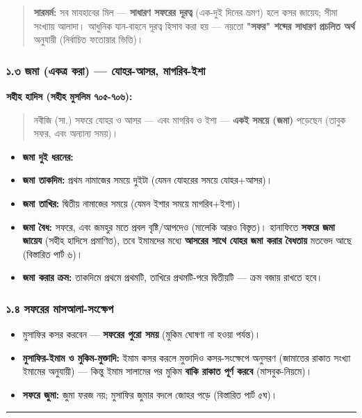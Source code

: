 \begin{quote}
\textbf{সারমর্ম:} সব মাযহাবের মিল — \textbf{সাধারণ সফরের দূরত্ব} (এক-দুই দিনের ভ্রমণ) হলে কসর জায়েয; সীমা সংখ্যায় আলাদা। আধুনিক যান-বাহনে দূরত্ব হিসাব করা হয় — নয়তো \textbf{"সফর" শব্দের সাধারণ প্রচলিত অর্থ} অনুযায়ী (নির্বাচিত ফতোয়ার ভিত্তি)।
\end{quote}

\subsubsection*{১.৩ জমা (একত্র করা) — যোহর-আসর, মাগরিব-ইশা}

\textbf{সহীহ হাদিস (সহীহ মুসলিম ৭০৫-৭০৬):}

\begin{quote}
নবীজি (সা.) সফরে যোহর ও আসর — এবং মাগরিব ও ইশা — \textbf{একই সময়ে (জমা)} পড়েছেন (তাবুক সফর, এবং অন্যান্য সময়)।
\end{quote}

\begin{itemize}
\item \textbf{জমা দুই ধরনের:}
\item \textbf{জমা তাকদিম:} প্রথম নামাজের সময়ে দুইটা (যেমন যোহরের সময়ে যোহর+আসর)।
\item \textbf{জমা তাখির:} দ্বিতীয় নামাজের সময়ে (যেমন ইশার সময়ে মাগরিব+ইশা)।
\item \textbf{জমা বৈধ:} সফরে, এবং জমহুর মতে প্রবল বৃষ্টি/আপদেও (মালেকি আরও বিস্তৃত)। হানাফিতে \textbf{সফরে জমা জায়েয} (সহীহ হাদিসে প্রমাণিত), তবে ইমামদের মধ্যে \textbf{আসরের সাথে যোহর জমা করার বৈধতায়} মতভেদ আছে (বিস্তারিত পার্ট ৬)।
\item \textbf{জমা করার ক্রম:} তাকদিমে প্রথমে প্রথমটি, তাখিরে প্রথমটি-পরে দ্বিতীয়টি — ক্রম বজায় রাখতে হবে।
\end{itemize}
\subsubsection*{১.৪ সফরের মাসআলা-সংক্ষেপ}

\begin{itemize}
\item মুসাফির কসর করবেন — \textbf{সফরের পুরো সময়} (মুকিম ঘোষণা না হওয়া পর্যন্ত)।
\item \textbf{মুসাফির-ইমাম ও মুকিম-মুক্তাদি:} ইমাম কসর করলে মুক্তাদিও কসর-সংক্ষেপে অনুসরণ (জামাতের রাকাত সংখ্যা ইমামের অনুযায়ী) — কিন্তু ইমাম সালামের পর মুকিম \textbf{বাকি রাকাত পূর্ণ করবে} (মাসবুক-নিয়মে)।
\item \textbf{সফরে জুমা:} জুমা ফরজ নয়; মুসাফির জুমার বদলে জোহর পড়ে (বিস্তারিত পার্ট ৫ঘ)।
\end{itemize}
\medskip\hrule\medskip

